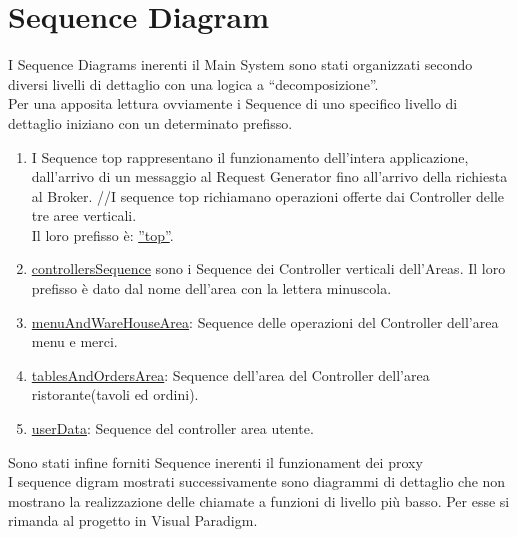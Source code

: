 \section{Sequence Diagram}
I Sequence Diagrams inerenti il Main System sono stati organizzati secondo diversi livelli di dettaglio con una logica a “decomposizione”.
\\Per una apposita lettura ovviamente i Sequence di uno specifico livello di dettaglio iniziano con un determinato prefisso.
\begin{enumerate}
	\item I Sequence top rappresentano il funzionamento dell’intera applicazione, dall’arrivo di un messaggio al Request Generator fino all’arrivo della richiesta al Broker.
	//I sequence top richiamano operazioni offerte dai Controller delle tre aree verticali.
	\\Il loro prefisso è: \underline{”top”}. 
	\item \underline{controllersSequence} sono i Sequence dei Controller verticali dell’Areas.
	Il loro prefisso è dato dal nome dell’area con la lettera minuscola.
	\item \underline{menuAndWareHouseArea}: Sequence delle operazioni del Controller dell’area menu e merci.
	\item \underline{tablesAndOrdersArea}: Sequence dell’area del Controller dell’area ristorante(tavoli ed ordini).
	\item \underline{userData}: Sequence del controller area utente.
\end{enumerate}
Sono stati infine forniti Sequence inerenti il funzionament dei proxy
\\I sequence digram mostrati successivamente sono diagrammi di dettaglio che non mostrano la realizzazione delle chiamate a funzioni di livello più basso. Per esse si rimanda al progetto in Visual Paradigm.

